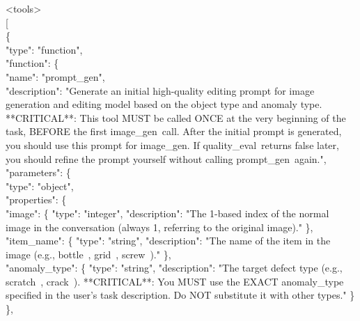 \documentclass[sigconf]{acmart}
\begin{document}
\begin{tcolorbox}
<tools> \\
{[} \\
\hspace*{1em}\{ \\
\hspace*{2em}"type": "function", \\
\hspace*{2em}"function": \{ \\
\hspace*{3em}"name": "prompt\_gen", \\
\hspace*{3em}"description": "Generate an initial high-quality editing prompt for image generation and editing model based on the object type and anomaly type. **CRITICAL**: This tool MUST be called ONCE at the very beginning of the task, BEFORE the first \textquotesingle image\_gen\textquotesingle \ call. After the initial prompt is generated, you should use this prompt for \textquotesingle image\_gen\textquotesingle. If \textquotesingle quality\_eval\textquotesingle \ returns false later, you should refine the prompt yourself without calling \textquotesingle prompt\_gen\textquotesingle \ again.", \\
\hspace*{3em}"parameters": \{ \\
\hspace*{4em}"type": "object", \\
\hspace*{4em}"properties": \{ \\
\hspace*{5em}"image": \{ "type": "integer", "description": "The 1-based index of the normal image in the conversation (always 1, referring to the original image)." \}, \\
\hspace*{5em}"item\_name": \{ "type": "string", "description": "The name of the item in the image (e.g., \textquotesingle bottle\textquotesingle \ , \textquotesingle grid\textquotesingle \ , \textquotesingle screw\textquotesingle \ )." \}, \\
\hspace*{5em}"anomaly\_type": \{ "type": "string", "description": "The target defect type (e.g., \textquotesingle scratch\textquotesingle \ , \textquotesingle crack\textquotesingle \ ). **CRITICAL**: You MUST use the EXACT anomaly\_type specified in the user's task description. Do NOT substitute it with other types." \} \\
\hspace*{4em}\}, \\

\end{tcolorbox}
\end{document}

